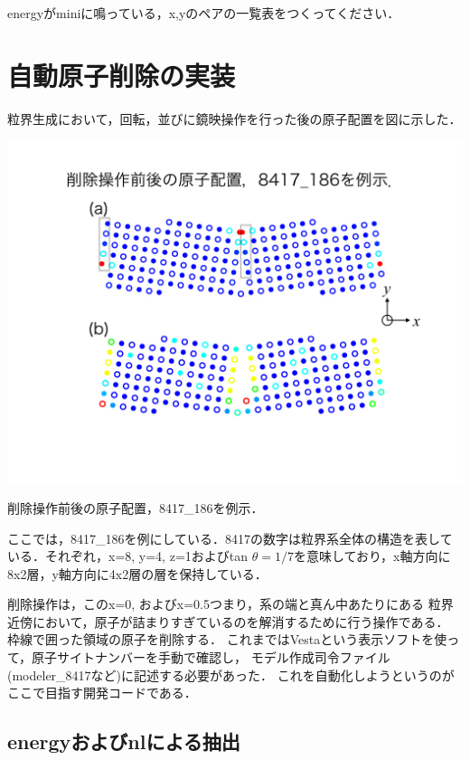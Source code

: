 \documentclass[11pt,dvipdfmx]{jsarticle}
\begin{document}
energyがminiに鳴っている，x,yのペアの一覧表をつくってください．

    \section{自動原子削除の実装}\label{ux81eaux52d5ux539fux5b50ux524aux9664ux306eux5b9fux88c5}

粒界生成において，回転，並びに鏡映操作を行った後の原子配置を図に示した．

\begin{center}
\includegraphics[width=150mm]{../.././auto_delete/auto_delete_002.jpeg}
\end{center}
削除操作前後の原子配置，8417\_186を例示．

\label{fig:}

ここでは，8417\_186を例にしている．8417の数字は粒界系全体の構造を表している．それぞれ，x=8,
y=4, z=1およびtan
\(\theta=1/7\)を意味しており，x軸方向に8x2層，y軸方向に4x2層の層を保持している．

削除操作は，このx=0, およびx=0.5つまり，系の端と真ん中あたりにある
粒界近傍において，原子が詰まりすぎているのを解消するために行う操作である．
枠線で囲った領域の原子を削除する．
これまではVestaという表示ソフトを使って，原子サイトナンバーを手動で確認し，
モデル作成司令ファイル(modeler\_8417など)に記述する必要があった．
これを自動化しようというのがここで目指す開発コードである．

    \subsection{energyおよびnlによる抽出}\label{energyux304aux3088ux3073nlux306bux3088ux308bux62bdux51fa}
\end{document}
